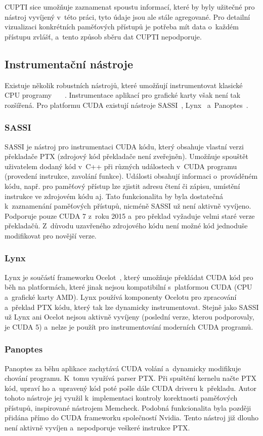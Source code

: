 CUPTI sice umožňuje zaznamenat spoustu informací, které by byly užitečné pro nástroj vyvíjený v~této práci, tyto údaje jsou ale stále agregované. Pro detailní vizualizaci konkrétních paměťových přístupů je potřeba mít data o~každém přístupu zvlášť, a~tento způsob sběru dat CUPTI nepodporuje.

\subsection{Instrumentační nástroje}
Existuje několik robustních nástrojů, které umožňují instrumentovat klasické CPU programy~\cite{valgrind}~\cite{pin} ~\cite{dynamorio}. Instrumentace aplikací pro grafické karty však není tak rozšířená. Pro platformu CUDA existují nástroje SASSI~\cite{sassi}, Lynx~\cite{lynx} a~Panoptes~\cite{panoptes}.

\subsubsection*{SASSI}
SASSI je nástroj pro instrumentaci CUDA kódu, který obsahuje vlastní verzi překladače PTX (zdrojový kód překladače není zveřejněn). Umožňuje spouštět uživatelem dodaný kód v~C++ při různých událostech v~CUDA programu (provedení instrukce, zavolání funkce). Události obsahují informaci o~prováděném kódu, např. pro paměťový přístup lze zjistit adresu čtení či zápisu, umístění instrukce ve zdrojovém kódu aj. Tato funkcionalita by byla dostatečná k~zaznamenání paměťových přístupů, nicméně SASSI už není aktivně vyvíjeno. Podporuje pouze CUDA 7 z~roku 2015 a~pro překlad vyžaduje velmi staré verze překladačů. Z~důvodu uzavřeného zdrojového kódu není možné kód jednoduše modifikovat pro novější verze.

\subsubsection*{Lynx}
Lynx je součástí frameworku Ocelot~\cite{ocelot}, který umožňuje překládat CUDA kód pro běh na platformách, které jinak nejsou kompatibilní s~platformou CUDA (CPU a~grafické karty AMD). Lynx používá komponenty Ocelotu pro zpracování a~překlad PTX kódu, který tak lze dynamicky instrumentovat. Stejně jako SASSI už Lynx ani Ocelot nejsou aktivně vyvíjeny (poslední verze, kterou podporovaly, je CUDA 5) a~nelze je použít pro instrumentování moderních CUDA programů.

\subsubsection*{Panoptes}
Panoptes za běhu aplikace zachytává CUDA volání a~dynamicky modifikuje chování programu. K~tomu využívá parser PTX. Při spuštění kernelu načte PTX kód, upraví ho a~upravený kód poté pošle dále CUDA driveru k~překladu. Autor tohoto nástroje jej využil k~implementaci kontroly korektnosti paměťových přístupů, inspirované nástrojem Memcheck. Podobná funkcionalita byla později přidána přímo do CUDA frameworku společností Nvidia. Tento nástroj již dlouho není aktivně vyvíjen a~nepodporuje veškeré instrukce PTX.

